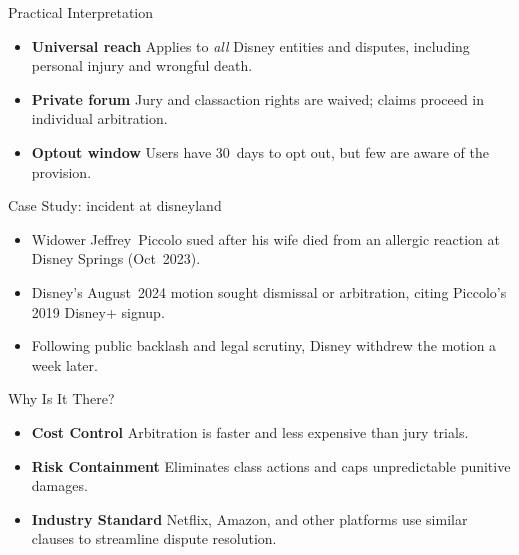 \begin{frame}{Practical Interpretation}
  \begin{itemize}
    \item \textbf{Universal reach} \textemdash{} Applies to \emph{all} Disney entities and disputes, including personal injury and wrongful death.
    \item \textbf{Private forum} \textemdash{} Jury and class\textendash{}action rights are waived; claims proceed in individual arbitration.
    \item \textbf{Opt\textendash{}out window} \textemdash{} Users have 30 days to opt out, but few are aware of the provision.
  \end{itemize}
\end{frame}

\begin{frame}{Case Study: incident at disneyland}
  \small
  \begin{itemize}
    \item Widower Jeffrey Piccolo sued after his wife died from an allergic reaction at Disney Springs (Oct~2023).
    \item Disney’s August~2024 motion sought dismissal or arbitration, citing Piccolo’s 2019 Disney+ sign\textendash{}up.
    \item Following public backlash and legal scrutiny, Disney withdrew the motion a week later. \cite{Disney}
  \end{itemize}
\end{frame}

\begin{frame}{Why Is It There?}
  \begin{itemize}
    \item \textbf{Cost Control} \textemdash{} Arbitration is faster and less expensive than jury trials.
    \item \textbf{Risk Containment} \textemdash{} Eliminates class actions and caps unpredictable punitive damages.
    \item \textbf{Industry Standard} \textemdash{} Netflix, Amazon, and other platforms use similar clauses to streamline dispute resolution.
  \end{itemize}
\end{frame}
